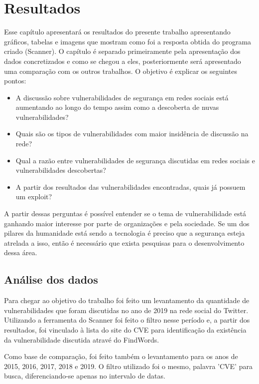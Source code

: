 \chapter[Resultados]{Resultados}

Esse capítulo apresentará os resultados do presente trabalho apresentando gráficos, tabelas e imagens que mostram como foi a resposta obtida do programa criado (Scanner). O capítulo é separado primeiramente pela apresentação dos dados concretizados e como se chegou a eles, posteriormente será apresentado uma comparação com os outros trabalhos. O objetivo é explicar os seguintes pontos:

\begin{itemize}
\item A discussão sobre vulnerabilidades de segurança em redes sociais está aumentando ao longo do tempo assim como a descoberta de nuvas vulnerabilidades?
\item Quais são os tipos de vulnerabilidades com maior insidência de discussão na rede?
\item Qual a razão entre vulnerabilidades de segurança discutidas em redes sociais e vulnerabilidades descobertas?
\item A partir dos resultados das vulnerabilidades encontradas, quais já possuem um exploit?
\end{itemize}

A partir dessas perguntas é possível entender se o tema de vulnerabilidade está ganhando maior interesse por parte de organizações e pela sociedade. Se um dos pilares da humanidade está sendo a tecnologia é preciso que a segurança esteja atrelada a isso, então é necessário que exista pesquisas para o desenvolvimento dessa área.

\section{Análise dos dados}

Para chegar ao objetivo do trabalho foi feito um levantamento da quantidade de vulnerabilidades que foram discutidas no ano de 2019 na rede social do Twitter. Utilizando a ferramenta do Scanner foi feito o filtro nesse período e, a partir dos resultados, foi vinculado à lista do site do CVE para identificação da existência da vulnerabilidade discutida atravé do FindWords. 

Como base de comparação, foi feito também o levantamento para os anos de 2015, 2016, 2017, 2018 e 2019. O filtro utilizado foi o mesmo, palavra 'CVE' para busca, diferenciando-se apenas no intervalo de datas.


